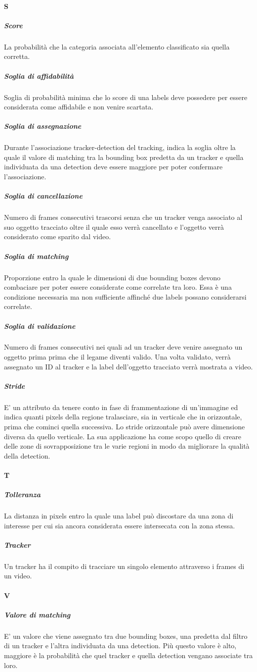 \paragraph{S}
\subparagraph{Score} La probabilità che la categoria associata all'elemento classificato sia quella corretta.
\subparagraph{Soglia di affidabilità}
Soglia di probabilità minima che lo score di una labels deve possedere per essere considerata come affidabile e non venire scartata.
\subparagraph{Soglia di assegnazione}
Durante l'associazione tracker-detection del tracking, indica la soglia oltre la quale il valore di matching tra la bounding box predetta da un tracker e quella individuata da una detection deve essere maggiore per poter confermare l'associazione.
\subparagraph{Soglia di cancellazione}
Numero di frames consecutivi trascorsi senza che un tracker venga associato al suo oggetto tracciato oltre il quale esso verrà cancellato e l'oggetto verrà considerato come sparito dal video.
\subparagraph{Soglia di matching}
Proporzione entro la quale le dimensioni di due bounding boxes devono combaciare per poter essere considerate come correlate tra loro. Essa è una condizione necessaria ma non sufficiente affinché due labels possano considerarsi correlate.
\subparagraph{Soglia di validazione}
Numero di frames consecutivi nei quali ad un tracker deve venire assegnato un oggetto prima prima che il legame diventi valido. Una volta validato, verrà assegnato un ID al tracker e la label dell'oggetto tracciato verrà mostrata a video.
\subparagraph{Stride} 
E' un attributo da tenere conto in fase di frammentazione di un'immagine ed indica quanti pixels della regione tralasciare, sia in verticale che in orizzontale, prima che cominci quella successiva. Lo stride orizzontale può avere dimensione diversa da quello verticale. La sua applicazione ha come scopo quello di creare delle zone di sovrapposizione tra le varie regioni in modo da migliorare la qualità della detection.

\paragraph{T}
\subparagraph{Tolleranza} 
La distanza in pixels entro la quale una label può discostare da una zona di interesse per cui sia ancora considerata essere intersecata con la zona stessa.
\subparagraph{Tracker}
Un tracker ha il compito di tracciare un singolo elemento attraverso i frames di un video.

\paragraph{V}
\subparagraph{Valore di matching} 
E' un valore che viene assegnato tra due bounding boxes, una predetta dal filtro di un tracker e l'altra individuata da una detection. Più questo valore è alto, maggiore è la probabilità che quel tracker e quella detection vengano associate tra loro.
